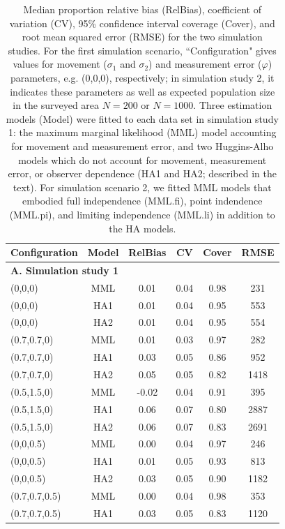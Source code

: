 \documentclass[aoas,preprint]{imsart}
\numberwithin{equation}{section}
\theoremstyle{plain}
\begin{document}
\begin{table}[ht]
\caption{Median proportion relative bias (RelBias), coefficient of variation (CV), 95\% confidence interval coverage (Cover), and root mean squared error (RMSE) for the two simulation studies. For the first simulation scenario, ``Configuration" gives values for movement ($\sigma_1$ and $\sigma_2$) and measurement error ($\varphi$) parameters, e.g. (0,0,0), respectively; in simulation study 2, it indicates these parameters as well as expected population size in the surveyed area $N=200$ or $N=1000$.  Three estimation models (Model) were fitted to each data set in simulation study 1: the maximum marginal likelihood (MML) model accounting for movement and measurement error, and two Huggins-Alho models which do not account for movement, measurement error, or observer dependence (HA1 and HA2; described in the text).  For simulation scenario 2, we fitted MML models that embodied full independence (MML.fi), point indendence (MML.pi), and limiting independence (MML.li) in addition to the HA models.
}
\label{tab:sims}
\raggedright
\begin{tabular}{lccccc}
  \hline
   Configuration & Model & RelBias & CV & Cover & RMSE \\
  \hline
   \multicolumn{6}{l}{\textbf{A. Simulation study 1}}   \\
  \hline
  (0,0,0) & MML & 0.01 & 0.04 & 0.98 & 231 \\
  (0,0,0) & HA1 & 0.01 & 0.04 & 0.95 & 553 \\
  (0,0,0) & HA2 & 0.01 & 0.04 & 0.95 & 554 \\
  (0.7,0.7,0) & MML & 0.01 & 0.03 & 0.97 & 282 \\
  (0.7,0.7,0) & HA1 & 0.03 & 0.05 & 0.86 & 952 \\
  (0.7,0.7,0) & HA2 & 0.05 & 0.05 & 0.82 & 1418 \\
  (0.5,1.5,0) & MML & -0.02 & 0.04 & 0.91 & 395 \\
  (0.5,1.5,0) & HA1 & 0.06 & 0.07 & 0.80 & 2887\\
  (0.5,1.5,0) & HA2 & 0.06 & 0.07 & 0.83 & 2691 \\
  (0,0,0.5) & MML & 0.00 & 0.04 & 0.97 & 246 \\
  (0,0,0.5) & HA1 & 0.01 & 0.05 & 0.93 & 813 \\
  (0,0,0.5) & HA2 & 0.03 & 0.05 & 0.90 & 1182 \\
  (0.7,0.7,0.5) & MML & 0.00 & 0.04 & 0.98 & 353 \\
  (0.7,0.7,0.5) & HA1 & 0.03 & 0.05 & 0.83 & 1120 \\

\end{tabular}
\end{table}
\end{document}
